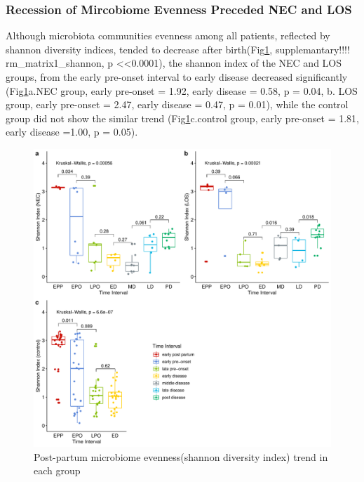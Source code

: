\documentclass[fleqn,10pt, lineno]{wlpeerj} %
\begin{document}
    \subsubsection*{Recession of Mircobiome Evenness Preceded NEC and LOS}
    Although microbiota communities evenness among all patients, reflected by shannon diversity indices, tended to decrease after birth(Fig\ref{fig:shannon-group-time}, supplemantary!!!! rm\_matrix1\_shannon, p \textless <0.0001), the shannon index of the NEC and LOS groups, from the early pre-onset interval to early disease decreased significantly (Fig\ref{fig:shannon-group-time}a.NEC group, early pre-onset = 1.92, early disease = 0.58, p = 0.04, b. LOS group, early pre-onset = 2.47, early disease = 0.47, p = 0.01), while the control group did not show the similar trend (Fig\ref{fig:shannon-group-time}c.control group, early pre-onset = 1.81, early disease =1.00, p = 0.05).
    \begin{figure}[ht]\centering
      \includegraphics[width=\linewidth]{figure/shannon-group-time.pdf}
      \caption{Post-partum microbiome evenness(shannon diversity index) trend in each group}
      \label{fig:shannon-group-time}
    \end{figure}
\end{document}
